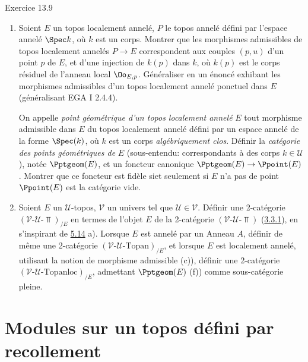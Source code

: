 \documentclass[10pt]{../fichiers-configuration-latex/smfart}
\begin{document}
\begin{enonce*}[remark]{Exercice 13.9}
\begin{enumerate}
\item Soient $E$ un topos localement annelé, $P$ le topos annelé
défini par l'espace annelé $\Spec k$, où $k$ est un corps. Montrer
que les morphismes admissibles de topos localement annelés
$P\rightarrow E$ correspondent aux couples $(p,u)$ d'un point $p$ de
$E$, et d'une injection de $k(p)$ dans $k$, où $k(p)$ est le corps
résiduel de l'anneau local ${\Oo}_{E,p}$. Généraliser en un
énoncé exhibant les morphismes admissibles d'un topos localement
annelé ponctuel dans $E$ (généralisant EGA I 2.4.4).

On appelle \emph{point géométrique d'un topos localement
  annelé} $E$
tout morphisme admissible dans $E$ du topos localement annelé défini
par un espace annelé de la forme $\Spec(k)$, où $k$ est un corps
\emph{algébriquement clos}. Définir la \emph{catégorie des points
géométriques de} $E$ (sous-entendu: correspondants à des corps $k\in
𝒰$), notée $\Pptgeom(E)$, et un foncteur canonique
$\Pptgeom(E)\rightarrow \Ppoint(E)$. Montrer que ce foncteur est
fidèle si\pageoriginale et seulement si $E$ n'a pas de point \ie
$\Ppoint(E)$ est la catégorie vide.

\item Soient $E$ un $𝒰$-topos, $𝒱$ un univers tel que $𝒰\in
𝒱$. Définir une 2-catégorie
$(𝒱\text{-}𝒰\text{-}\Top)_{/E}$ en termes de l'objet
$E$ de la 2-catégorie $(𝒱\text{-}𝒰\text{-}\Top)$
(\hyperref[IV.subsubsec3.3.1]{3.3.1}), en s'inspirant de \hyperref[IV.exer5.14]{5.14} a).
Lorsque $E$ est annelé par un Anneau $A$, définir de même une
2-catégorie $(𝒱\text{-}𝒰\text{-}\text{Topan})_{/E}$, et
lorsque $E$ est localement annelé, utilisant la notion de morphisme
admissible (\cf c)), définir une 2-catégorie
$(𝒱\text{-}𝒰\text{-}\text{Topanloc})_{/E}$,
admettant $\Pptgeom(E)$ (\cf f)) comme sous-catégorie pleine.
\end{enumerate}
\end{enonce*}

\section{Modules sur un topos défini par recollement}
\end{document}
